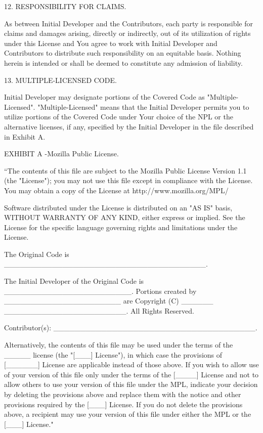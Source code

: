 \begin{DoxyCode}
12. RESPONSIBILITY FOR CLAIMS.

     As between Initial Developer and the Contributors, each party is
     responsible for claims and damages arising, directly or indirectly,
     out of its utilization of rights under this License and You agree to
     work with Initial Developer and Contributors to distribute such
     responsibility on an equitable basis. Nothing herein is intended or
     shall be deemed to constitute any admission of liability.

13. MULTIPLE-LICENSED CODE.

     Initial Developer may designate portions of the Covered Code as
     "Multiple-Licensed".  "Multiple-Licensed" means that the Initial
     Developer permits you to utilize portions of the Covered Code under
     Your choice of the NPL or the alternative licenses, if any, specified
     by the Initial Developer in the file described in Exhibit A.

EXHIBIT A -Mozilla Public License.

     ``The contents of this file are subject to the Mozilla Public License
     Version 1.1 (the "License"); you may not use this file except in
     compliance with the License. You may obtain a copy of the License at
     http://www.mozilla.org/MPL/

     Software distributed under the License is distributed on an "AS IS"
     basis, WITHOUT WARRANTY OF ANY KIND, either express or implied. See the
     License for the specific language governing rights and limitations
     under the License.

     The Original Code is \_\_\_\_\_\_\_\_\_\_\_\_\_\_\_\_\_\_\_\_\_\_\_\_\_\_\_\_\_\_\_\_\_\_\_\_\_\_.

     The Initial Developer of the Original Code is \_\_\_\_\_\_\_\_\_\_\_\_\_\_\_\_\_\_\_\_\_\_\_\_.
     Portions created by \_\_\_\_\_\_\_\_\_\_\_\_\_\_\_\_\_\_\_\_\_\_ are Copyright (C) \_\_\_\_\_\_
     \_\_\_\_\_\_\_\_\_\_\_\_\_\_\_\_\_\_\_\_\_\_\_. All Rights Reserved.

     Contributor(s): \_\_\_\_\_\_\_\_\_\_\_\_\_\_\_\_\_\_\_\_\_\_\_\_\_\_\_\_\_\_\_\_\_\_\_\_\_\_.

     Alternatively, the contents of this file may be used under the terms
     of the \_\_\_\_\_ license (the  "[\_\_\_] License"), in which case the
     provisions of [\_\_\_\_\_\_] License are applicable instead of those
     above.  If you wish to allow use of your version of this file only
     under the terms of the [\_\_\_\_] License and not to allow others to use
     your version of this file under the MPL, indicate your decision by
     deleting  the provisions above and replace  them with the notice and
     other provisions required by the [\_\_\_] License.  If you do not delete
     the provisions above, a recipient may use your version of this file
     under either the MPL or the [\_\_\_] License."


\end{DoxyCode}
